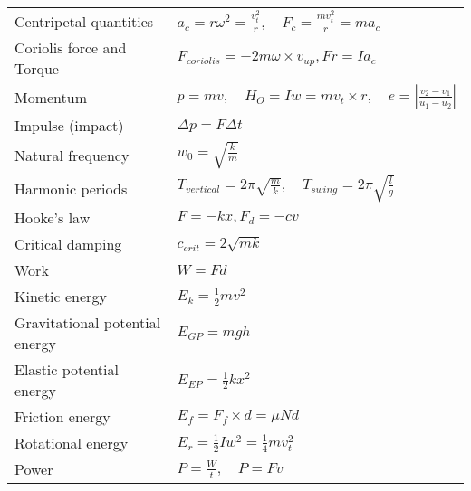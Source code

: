 \begin{tabular}{|l|l|}
    Centripetal quantities           & $a_c = r\omega^2 = \frac{v_t^2}{r},\quad F_c = \frac{mv_t^2}{r} = ma_c$                     \\
    Coriolis force and Torque        & $F_{coriolis} = -2m\omega\times v_{up}, Fr = Ia_c$                                          \\
    Momentum                         & $p=mv, \quad H_O=Iw=mv_t\times r,\quad e=|\frac{v_{2}-v_{1}}{u_{1}-u_{2}}|$                 \\
    Impulse (impact)                 & $\Delta p=F\Delta t$                                                                        \\
    Natural frequency                & $w_0=\sqrt{\frac{k}{m}}$                                                                    \\
    Harmonic periods                 & $T_{vertical} = 2\pi\sqrt{\frac{m}{k}},\quad T_{swing} = 2\pi\sqrt{\frac{l}{g}}$            \\
    Hooke's law                      & $F=-kx,F_d=-cv$                                                                             \\
    Critical damping                 & $c_{crit}=2\sqrt{mk}$                                                                       \\
    Work                             & $W=Fd$                                                                                      \\
    Kinetic energy                   & $E_k=\frac{1}{2}mv^2$                                                                       \\
    Gravitational potential energy   & $E_{GP}=mgh$                                                                                \\
    Elastic potential energy         & $E_{EP}=\frac{1}{2}kx^2$                                                                    \\
    Friction energy                  & $E_{f}=F_f\times d=\mu Nd$                                                                  \\
    Rotational energy                & $E_{r}=\frac{1}{2}Iw^2=\frac14mv_t^2$                                                       \\
    Power                            & $P=\frac{W}{t},\quad P=Fv$                                                                  \\\hline
\end{tabular}
